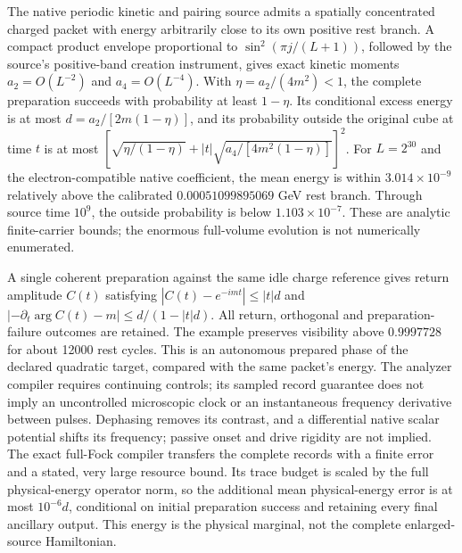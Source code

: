 The native periodic kinetic and pairing source admits a spatially
concentrated charged packet with energy arbitrarily close to its own
positive rest branch. A compact product envelope proportional to
$\sin^2(\pi j/(L+1))$, followed by the source's positive-band creation
instrument, gives exact kinetic moments $a_2=O(L^{-2})$ and
$a_4=O(L^{-4})$. With $\eta=a_2/(4m^2)<1$, the complete preparation succeeds
with probability at least $1-\eta$. Its conditional excess energy is at most
$d=a_2/[2m(1-\eta)]$, and its probability outside the original cube at time
$t$ is at most
$[\sqrt{\eta/(1-\eta)}+|t|\sqrt{a_4/[4m^2(1-\eta)]}]^2$.
For $L=2^{30}$ and the electron-compatible native coefficient, the mean
energy is within $3.014\times10^{-9}$ relatively above the calibrated
$0.00051099895069$ GeV rest branch. Through source time $10^9$, the outside
probability is below $1.103\times10^{-7}$. These are analytic finite-carrier
bounds; the enormous full-volume evolution is not numerically enumerated.

A single coherent preparation against the same idle charge reference gives
return amplitude $C(t)$ satisfying $|C(t)-e^{-imt}|\le |t|d$ and
$|-\partial_t\arg C(t)-m|\le d/(1-|t|d)$. All return, orthogonal and
preparation-failure outcomes are retained. The example preserves visibility
above $0.9997728$ for about 12000 rest cycles. This is an autonomous prepared
phase of the declared quadratic target, compared with the same packet's
energy. The analyzer compiler requires continuing controls; its sampled
record guarantee does not imply an uncontrolled microscopic clock or an
instantaneous frequency derivative between pulses. Dephasing removes its contrast,
and a differential native scalar potential shifts its frequency; passive
onset and drive rigidity are not implied. The exact full-Fock compiler
transfers the complete records with a finite error and a stated, very large
resource bound. Its trace budget is scaled by the full physical-energy
operator norm, so the additional mean physical-energy error is at most
$10^{-6}d$, conditional on initial preparation success and retaining every
final ancillary output. This energy is the physical marginal, not the
complete enlarged-source Hamiltonian.
